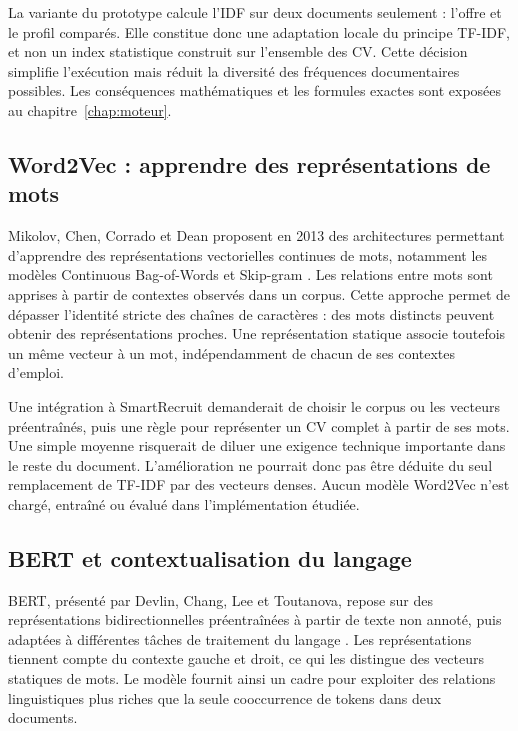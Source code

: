 La variante du prototype calcule l'IDF sur deux documents seulement : l'offre et le profil comparés. Elle constitue donc une adaptation locale du principe TF-IDF, et non un index statistique construit sur l'ensemble des CV. Cette décision simplifie l'exécution mais réduit la diversité des fréquences documentaires possibles. Les conséquences mathématiques et les formules exactes sont exposées au chapitre~\ref{chap:moteur}.

\subsection{Word2Vec : apprendre des représentations de mots}

Mikolov, Chen, Corrado et Dean proposent en 2013 des architectures permettant d'apprendre des représentations vectorielles continues de mots, notamment les modèles Continuous Bag-of-Words et Skip-gram \cite{mikolov2013}. Les relations entre mots sont apprises à partir de contextes observés dans un corpus. Cette approche permet de dépasser l'identité stricte des chaînes de caractères : des mots distincts peuvent obtenir des représentations proches. Une représentation statique associe toutefois un même vecteur à un mot, indépendamment de chacun de ses contextes d'emploi.

Une intégration à SmartRecruit demanderait de choisir le corpus ou les vecteurs préentraînés, puis une règle pour représenter un CV complet à partir de ses mots. Une simple moyenne risquerait de diluer une exigence technique importante dans le reste du document. L'amélioration ne pourrait donc pas être déduite du seul remplacement de TF-IDF par des vecteurs denses. Aucun modèle Word2Vec n'est chargé, entraîné ou évalué dans l'implémentation étudiée.

\subsection{BERT et contextualisation du langage}

BERT, présenté par Devlin, Chang, Lee et Toutanova, repose sur des représentations bidirectionnelles préentraînées à partir de texte non annoté, puis adaptées à différentes tâches de traitement du langage \cite{devlin2019}. Les représentations tiennent compte du contexte gauche et droit, ce qui les distingue des vecteurs statiques de mots. Le modèle fournit ainsi un cadre pour exploiter des relations linguistiques plus riches que la seule cooccurrence de tokens dans deux documents.

